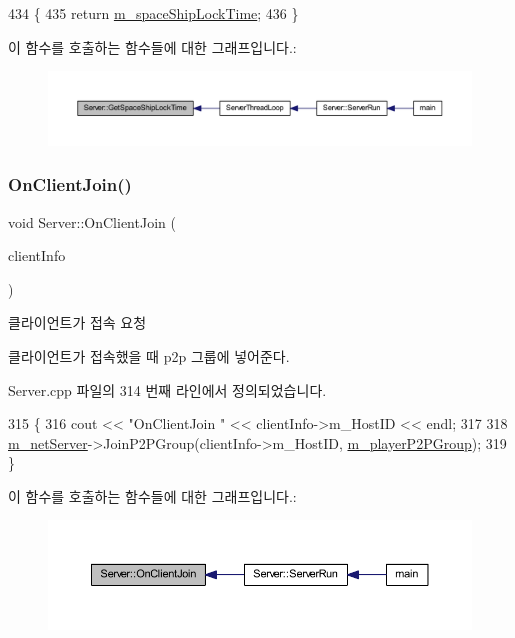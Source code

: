 \begin{DoxyCode}
434 \{
435     \textcolor{keywordflow}{return} \hyperlink{class_server_a21ee3e9152293a6e6d47fd569ee3f37a}{m\_spaceShipLockTime};
436 \}
\end{DoxyCode}
이 함수를 호출하는 함수들에 대한 그래프입니다.\+:\nopagebreak
\begin{figure}[H]
\begin{center}
\leavevmode
\includegraphics[width=350pt]{class_server_a4ad8b199648bad8ea03b9e161b1bcb10_icgraph}
\end{center}
\end{figure}
\mbox{\label{class_server_af0a8684eda8d55b06a48a100320a2f3c}} 
\subsubsection{\texorpdfstring{On\+Client\+Join()}{OnClientJoin()}}
{\footnotesize\ttfamily void Server\+::\+On\+Client\+Join (\begin{DoxyParamCaption}\item[{C\+Net\+Client\+Info $\ast$}]{client\+Info }\end{DoxyParamCaption})}



클라이언트가 접속 요청 

클라이언트가 접속했을 때  p2p 그룹에 넣어준다. 

Server.\+cpp 파일의 314 번째 라인에서 정의되었습니다.


\begin{DoxyCode}
315 \{
316     cout << \textcolor{stringliteral}{"OnClientJoin "} << clientInfo->m\_HostID << endl;
317     
318     \hyperlink{class_server_acc5f0ab874532daace973f25df16888e}{m\_netServer}->JoinP2PGroup(clientInfo->m\_HostID, \hyperlink{class_server_a8f7f03253584e9db740a5f9f97ff1fc5}{m\_playerP2PGroup});
319 \}
\end{DoxyCode}
이 함수를 호출하는 함수들에 대한 그래프입니다.\+:\nopagebreak
\begin{figure}[H]
\begin{center}
\leavevmode
\includegraphics[width=350pt]{class_server_af0a8684eda8d55b06a48a100320a2f3c_icgraph}
\end{center}
\end{figure}
\mbox{\label{class_server_a1249766dc00efcf1f29a2aaad56f83ef}} 
